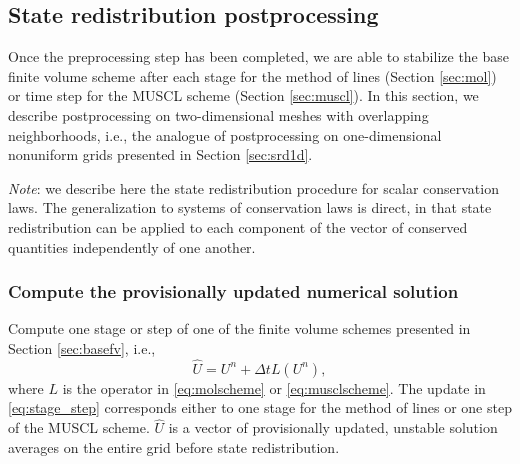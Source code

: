



\subsection{State redistribution postprocessing} \label{sec:srd_postprocessing}

Once the preprocessing step has been completed, we are able to stabilize the base finite volume scheme after each stage for the method of lines (Section \ref{sec:mol}) or time step for the MUSCL scheme (Section \ref{sec:muscl}). 
In this section, we describe postprocessing on two-dimensional meshes with overlapping neighborhoods, i.e., the analogue of postprocessing on one-dimensional nonuniform grids presented in Section \ref{sec:srd1d}.

\textit{Note}: we describe here the state redistribution procedure for scalar conservation laws.  The generalization to systems of conservation laws is direct, in that state redistribution can be applied to each component of the vector of conserved quantities independently of one another.

\subsubsection*{Compute the provisionally updated numerical solution}   
Compute one stage or step of one of the finite volume schemes presented in Section \ref{sec:basefv}, i.e.,
\begin{equation} \label{eq:stage_step}
\widehat{U} = U^n + \Delta t  L(U^n),
\end{equation}
where $L$ is the operator in \eqref{eq:molscheme} or \eqref{eq:musclscheme}.  
The update in \eqref{eq:stage_step} corresponds either to one stage for the method of lines or one step of the MUSCL scheme.
$\widehat{U}$ is a vector of provisionally updated, unstable solution averages on the entire grid before state redistribution.

